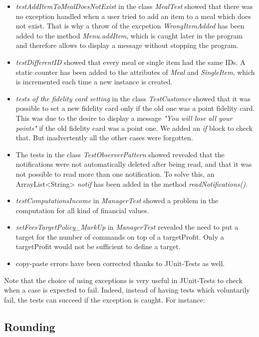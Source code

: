 \begin{itemize}
	\item{\textit{testAddItemToMealDoesNotExist}} in the class \textit{MealTest} showed that there was no exception handled when a user tried to add an item to a meal which does not exist. That is why a throw of the excpetion \textit{WrongItemAdded} has been added to the method \textit{Menu.addItem}, which is caught later in the program and therefore allows to display a message without stopping the program.
	\item{\textit{testDifferentID}} showed that every meal or single item had the same IDs. A static counter has been added to the attributes of \textit{Meal} and \textit{SingleItem}, which is incremented each time a new instance is created.
	\item{\textit{tests of the fidelity card setting}} in the class \textit{TestCustomer} showed that it was possible to set a new fidelity card only if the old one was a point fidelity card. This was due to the desire to display a message \textit{"You will lose all your points"} if the old fidelity card was a point one. We added an \textit{if} block to check that. But inadvertently all the other cases were forgotten.
	\item The tests in the class \textit{TestObserverPattern} showed revealed that the notifications were not automatically deleted after being read, and that it was not possible to read more than one notification. To solve this, an ArrayList<String> \textit{notif} has been added in the method \textit{readNotifications()}.
	\item{\textit{testComputationsIncome}} in \textit{ManagerTest} showed a problem in the 
		computation for all kind of financial values.
	\item{\textit{setFeesTargetPolicy\_MarkUp}} in \textit{ManagerTest} revealed the need to put
		a target for the number of commands on top of a targetProfit. Only a targetProfit 
		would not be sufficient to define a target.	
	\item{} copy-paste errors have been corrected thanks to JUnit-Tests as well.
\end{itemize}
Note that the choice of using exceptions is very useful in JUnit-Tests to check when a case is expected to fail. Indeed, instead of having tests which voluntarily fail, the tests can succeed if the exception is caught. For instance:


\subsection{Rounding}
\label{sub:rounding}


